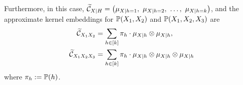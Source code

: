 \documentclass{article}
\begin{document}

Furthermore, in this case, $\widetilde \Ccal_{X|H} = \rbr{\mu_{X|h=1},\ \mu_{X|h=2},\ \ldots,\ \mu_{X|h=k}}$, and the approximate kernel embeddings for $\mathbb{P}(X_1,X_2)$ and $\mathbb{P}(X_1,X_2,X_3)$ are
\begin{align}
  \widetilde {\mathcal{C}}_{X_1 X_2}
  & = \sum_{h \in [k]} \pi_h \cdot \mu_{X|h} \otimes \mu_{X|h}, \label{eq:joint2} \\
  \widetilde {\mathcal{C}}_{X_1 X_2 X_3}
  &= \sum_{h \in [k]} \pi_h \cdot \mu_{X|h} \otimes \mu_{X|h} \otimes \mu_{X|h} \label{eq:joint3}
\end{align}
where $\pi_h:=\mathbb{P}(h)$.
\end{document}
